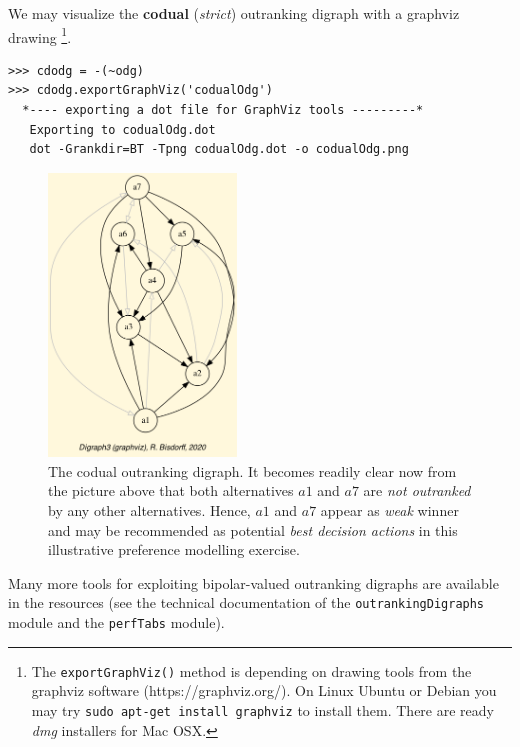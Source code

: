 We may visualize the {\bf codual} ({\em strict\/}) outranking digraph with a graphviz drawing \footnote{The \texttt{exportGraphViz()} method is depending on drawing tools from the graphviz software (https://graphviz.org/). On Linux Ubuntu or Debian you may try \texttt{sudo apt-get install graphviz} to install them. There are ready \emph{dmg} installers for Mac OSX.}.

\begin{lstlisting}
>>> cdodg = -(~odg)
>>> cdodg.exportGraphViz('codualOdg')
  *---- exporting a dot file for GraphViz tools ---------*
   Exporting to codualOdg.dot
   dot -Grankdir=BT -Tpng codualOdg.dot -o codualOdg.png
\end{lstlisting}

\begin{figure}[h]
\sidecaption
\includegraphics[width=5cm]{Figures/codualOdg.png}
\caption{The codual outranking digraph. It becomes readily clear now from the picture above that both alternatives $a1$  and $a7$ are {\em not outranked\/} by any other alternatives. Hence, $a1$  and $a7$ appear as \emph{weak} \Condorcet winner and may be recommended as potential {\em best decision actions\/} in this illustrative preference modelling exercise.}
\label{fig:3.1}       %
\end{figure}
 
Many more tools for exploiting bipolar-valued outranking digraphs are available in the  resources (see the technical documentation of the {\tt outrankingDigraphs} module and the {\tt perfTabs} module).

\clearpage
{}
{}

\typeout{}

